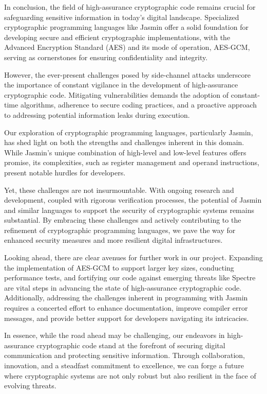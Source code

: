 \documentclass[runningheads]{llncs}
\begin{document}
In conclusion, the field of high-assurance cryptographic code remains crucial for safeguarding sensitive information in today's digital landscape. Specialized cryptographic programming languages like Jasmin offer a solid foundation for developing secure and efficient cryptographic implementations, with the Advanced Encryption Standard (AES) and its mode of operation, AES-GCM, serving as cornerstones for ensuring confidentiality and integrity.

However, the ever-present challenges posed by side-channel attacks underscore the importance of constant vigilance in the development of high-assurance cryptographic code. Mitigating vulnerabilities demands the adoption of constant-time algorithms, adherence to secure coding practices, and a proactive approach to addressing potential information leaks during execution.

Our exploration of cryptographic programming languages, particularly Jasmin, has shed light on both the strengths and challenges inherent in this domain. While Jasmin's unique combination of high-level and low-level features offers promise, its complexities, such as register management and operand instructions, present notable hurdles for developers.

Yet, these challenges are not insurmountable. With ongoing research and development, coupled with rigorous verification processes, the potential of Jasmin and similar languages to support the security of cryptographic systems remains substantial. By embracing these challenges and actively contributing to the refinement of cryptographic programming languages, we pave the way for enhanced security measures and more resilient digital infrastructures.

Looking ahead, there are clear avenues for further work in our project. Expanding the implementation of AES-GCM to support larger key sizes, conducting performance tests, and fortifying our code against emerging threats like Spectre are vital steps in advancing the state of high-assurance cryptographic code. Additionally, addressing the challenges inherent in programming with Jasmin requires a concerted effort to enhance documentation, improve compiler error messages, and provide better support for developers navigating its intricacies.

In essence, while the road ahead may be challenging, our endeavors in high-assurance cryptographic code stand at the forefront of securing digital communication and protecting sensitive information. Through collaboration, innovation, and a steadfast commitment to excellence, we can forge a future where cryptographic systems are not only robust but also resilient in the face of evolving threats.
\end{document}
